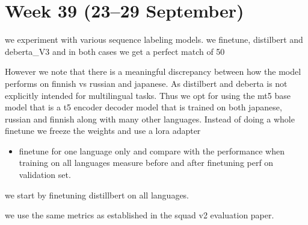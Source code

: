 \documentclass[11pt]{article}
\begin{document}
\section{Week 39 (23--29 September)}


we experiment with various sequence labeling models. we finetune, distilbert and deberta\_V3 and in both cases we get a perfect match of 50%

However we note that there is a meaningful discrepancy between how the model performs on finnish vs russian and japanese. As distilbert and deberta is not explicitly intended for multilingual tasks.
Thus we opt for using the mt5 base model that is a t5 encoder decoder model that is trained on both japanese, russian and finnish along with many other languages.
Instead of doing a whole finetune we freeze the weights and use a lora adapter 




\begin{itemize}
    \item 
    finetune for one language only and compare with the performance when training on all languages
    measure before and after finetuning perf on validation set.
\end{itemize}

we start by finetuning distillbert on all languages.


we use the same metrics as established in the squad v2 evaluation paper. \cite{rajpurkar-etal-2018-know}
\end{document}
